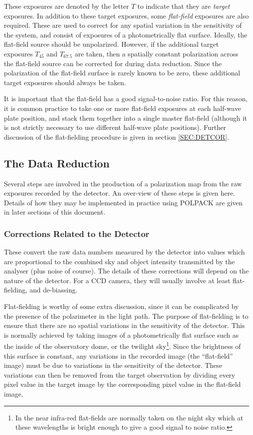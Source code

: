 \documentclass[twoside,11pt]{article}
\newcommand{\hyperref}[4]{#2\ref{#4}#3}
\newcommand{\xlabel}[1]{}
\renewcommand{\_}{\texttt{\symbol{95}}}
\begin{document}
These exposures are denoted by the letter $T$ to indicate that they are
\emph{target} exposures. In addition to these target exposures, some {\em
flat-field} exposures are also required. These are used to correct for
any spatial variation in the sensitivity of the system, and consist of
exposures of a photometrically flat surface. Ideally, the flat-field
source should be unpolarized. However, if the additional target exposures
$T_{45}$ and $T_{67.5}$ are taken, then a spatially constant polarization 
across the flat-field source can be corrected for during data reduction.
Since the polarization of the flat-field surface is rarely known to be
zero, these additional target exposures should always be taken. 

It is important that the flat-field has a good signal-to-noise ratio.
For this reason, it is common practice to take one or more flat-field 
exposures at each half-wave plate position, and stack them together into a 
single master flat-field (although it is not strictly necessary to use
different half-wave plate positions). Further discussion of the flat-fielding
procedure is given \hyperref{here}{in section }{}{SEC:DETCOR}. 

\subsection{\label{SEC:DBRED}\xlabel{thedatareduction}The Data Reduction}
Several steps are involved in the production of a polarization map from
the raw exposures recorded by the detector. An over-view of these steps
is given here. Details of how they may be implemented in practice using
POLPACK are given in later sections of this document.

\subsubsection{\label{SEC:DETCOR}Corrections Related to the Detector}
These convert the raw data numbers measured by the detector into values
which are proportional to the combined sky and object intensity
transmitted by the analyser (plus noise of course). The details of these
corrections will depend on the nature of the detector. For a CCD camera,
they will usually involve at least flat-fielding, and de-biassing. 

Flat-fielding is worthy of some extra discussion, since it can be
complicated by the presence of the polarimeter in the light path. The
purpose of flat-fielding is to ensure that there are no spatial
variations in the sensitivity of the detector. This is normally achieved
by taking images of a photometrically flat surface such as the inside of
the observatory dome, or the twilight sky\footnote{In the near infra-red
flat-fields are normally taken on the night sky which at these wavelengths
is bright enough to give a good signal to noise ratio.}. Since the
brightness of this surface is constant, any variations in the recorded
image (the ``flat-field'' image) must be due to variations in the
sensitivity of the detector. These variations can then be removed from the
target observation by dividing every pixel value in the target image by
the corresponding pixel value in the flat-field image.
\end{document}
